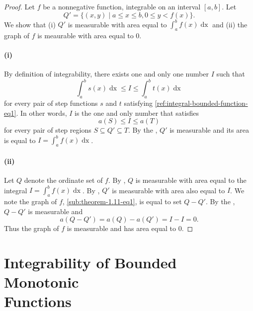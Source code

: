 \documentclass{report}
\begin{document}
\begin{proof}

  Let $f$ be a nonnegative function, integrable on an interval $[a, b]$.
  Let $$Q' = \{(x, y) \mid a \leq x \leq b, 0 \leq y < f(x)\}.$$
  We show that (i) $Q'$ is measurable with area equal to
    $\int_a^b f(x) \mathop{dx}$ and (ii) the graph of $f$ is meaurable with area
    equal to $0$.

  \paragraph{(i)}%
  \label{par:theorem-1.11-i}

    By definition of integrability, there exists one and only one number $I$
      such that
      $$\int_a^b s(x) \mathop{dx} \leq I \leq \int_a^b t(x) \mathop{dx}$$
      for every pair of step functions $s$ and $t$ satisfying
      \eqref{ref:integral-bounded-function-eq1}.
    In other words, $I$ is the one and only number that satisfies
      $$a(S) \leq I \leq a(T)$$ for every pair of step regions
      $S \subseteq Q' \subseteq T$.
    By the , $Q'$ is measurable and its
      area is equal to $I = \int_a^b f(x) \mathop{dx}$.

  \paragraph{(ii)}%

    Let $Q$ denote the ordinate set of $f$.
    By , $Q$ is measurable with area equal to the
      integral $I = \int_a^b f(x) \mathop{dx}$.
    By , $Q'$ is
      measurable with area also equal to $I$.
    We note the graph of $f$, \eqref{sub:theorem-1.11-eq1}, is equal to set
      $Q - Q'$.
    By the , $Q - Q'$ is measurable and
      $$a(Q - Q') = a(Q) - a(Q') = I - I = 0.$$
    Thus the graph of $f$ is measurable and has area equal to $0$.

\end{proof}

\section
  [Integrability of Bounded Monotonic Functions]
  {Integrability of Bounded Monotonic \texorpdfstring{\\}{}Functions}
\label{sec:integrability-bounded-monotonic-functions}
\end{document}
